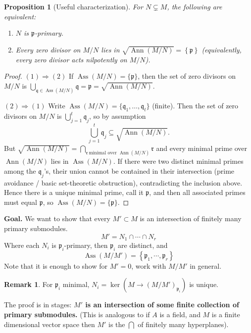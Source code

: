 \documentclass[11pt,a4paper]{article}
\theoremstyle{definition}
\newtheorem{remark}[definition]{Remark}
\theoremstyle{plain}
\newtheorem{proposition}[definition]{Proposition}
\theoremstyle{remark}
\renewcommand{\set}[1]{\left\{ #1 \right\}}
\newcommand{\Ann}{\operatorname{Ann}}
\newcommand{\Ass}{\operatorname{Ass}}
\begin{document}
\begin{proposition}[Useful characterization]
For $N\subsetneq M$, the following are equivalent:
\begin{enumerate}
    \item $N$ is $\mathfrak{p}$-primary.
    \item Every zero divisor on $M/N$ lies in $\sqrt{\Ann(M/N)} = \set{\mathfrak{p}}$ (equivalently, every zero divisor acts nilpotently on $M/N$).
\end{enumerate}
\end{proposition}

\begin{proof}
$(1)\Rightarrow(2)$ If $\Ass(M/N)=\{\mathfrak{p}\}$, then the set of zero divisors on $M/N$ is
$\bigcup_{\mathfrak{q}\in \Ass(M/N)}\mathfrak{q}=\mathfrak{p}=\sqrt{\Ann(M/N)}$.

$(2)\Rightarrow(1)$ Write $\Ass(M/N)=\{\mathfrak{q}_1,\dots,\mathfrak{q}_t\}$ (finite).
Then the set of zero divisors on $M/N$ is $\bigcup_{j=1}^t \mathfrak{q}_j$, so by assumption
\[
\bigcup_{j=1}^t \mathfrak{q}_j \subseteq \sqrt{\Ann(M/N)}.
\]
But $\sqrt{\Ann(M/N)}=\bigcap_{\mathfrak{r}\ \text{minimal over }\Ann(M/N)}\mathfrak{r}$ and every minimal prime over
$\Ann(M/N)$ lies in $\Ass(M/N)$. If there were two distinct minimal primes among the $\mathfrak{q}_j$'s, their union
cannot be contained in their intersection (prime avoidance / basic set-theoretic obstruction), contradicting the inclusion above.
Hence there is a unique minimal prime, call it $\mathfrak{p}$, and then all associated primes must equal $\mathfrak{p}$,
so $\Ass(M/N)=\{\mathfrak{p}\}$.
\end{proof}

\textbf{Goal.} We want to show that every $M' \subset M$ is an intersection of finitely many primary submodules. 
$$M' = N_1 \cap \cdots \cap N_r$$
Where each $N_i$ is $\mathfrak{p}_i$-primary, then $\mathfrak{p}_i$ are distinct, and 
$$\Ass (M/M') = \set{\mathfrak{p}_1, \cdots, \mathfrak{p}_r}$$
Note that it is enough to show for $M' = 0$, work with $M/M'$ in general.

\begin{remark}
    For $\mathfrak{p}_i$ minimal, $N_i = \ker (M \to (M/M')_{\mathfrak{p}_i})$ is unique.
\end{remark}

The proof is in stages: 
\textbf{$M'$ is an intersection of some finite collection of primary submodules.} (This is analogous to 
if $A$ is a field, and $M$ is a finite dimensional vector space then $M'$ is the $\bigcap$ of finitely many hyperplanes).  
\end{document}
